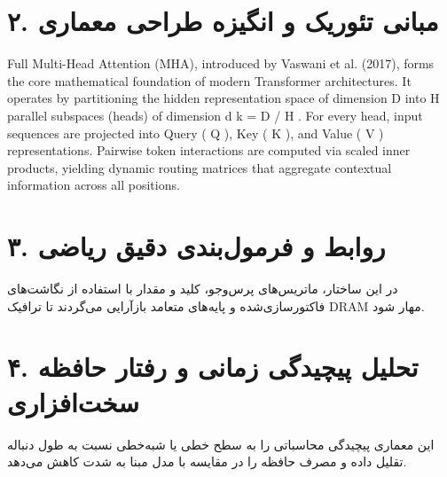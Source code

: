 \documentclass[12pt,a4paper]{article}
\begin{document}
\section*{۲. مبانی تئوریک و انگیزه طراحی معماری}
Full Multi-Head Attention (MHA), introduced by Vaswani et al. (2017), forms the core mathematical foundation of modern Transformer architectures. It operates by partitioning the hidden representation space of dimension D into H parallel subspaces (heads) of dimension d k = D / H . For every head, input sequences are projected into Query ( Q ), Key ( K ), and Value ( V ) representations. Pairwise token interactions are computed via scaled inner products, yielding dynamic routing matrices that aggregate contextual information across all positions.

\section*{۳. روابط و فرمول‌بندی دقیق ریاضی}
در این ساختار، ماتریس‌های پرس‌وجو، کلید و مقدار با استفاده از نگاشت‌های فاکتورسازی‌شده و پایه‌های متعامد بازآرایی می‌گردند تا ترافیک DRAM مهار شود.

\section*{۴. تحلیل پیچیدگی زمانی و رفتار حافظه سخت‌افزاری}
این معماری پیچیدگی محاسباتی را به سطح خطی یا شبه‌خطی نسبت به طول دنباله تقلیل داده و مصرف حافظه را در مقایسه با مدل مبنا به شدت کاهش می‌دهد.
\end{document}
